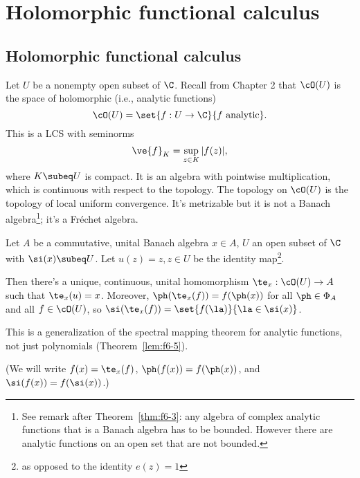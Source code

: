 \chapter{Holomorphic functional calculus}


\section{Holomorphic functional calculus}

Let $U$ be a nonempty open subset of $\C$. Recall from Chapter 2 that $\cO(U)$ is the space of holomorphic (i.e., analytic functions) 
\[
\cO(U)=\set{f:U\to \C}{f\text{ analytic}}.
\]
This is a LCS with seminorms 
\[\ve{f}_K=\sup_{z\in K}|f(z)|,\]
where $K\subeq U$ is compact. It is an algebra with pointwise multiplication, which is continuous with respect to the topology. The topology on $\cO(U)$ is the topology of local uniform convergence. It's metrizable but it is not a Banach algebra\footnote{See remark after Theorem~\ref{thm:f6-3}: any algebra of complex analytic functions that is a Banach algebra has to be bounded. However there are analytic functions on an open set that are not bounded.}; it's a Fr\'echet algebra.

\begin{thm}
Let $A$ be a commutative, unital Banach algebra $x\in A$, $U$ an open subset of $\C$ with $\si(x)\subeq U$. Let $u(z)=z, z\in U$ be the identity map\footnote{as opposed to the identity $e(z)=1$}.

Then there's a unique, continuous, unital homomorphism $\te_x:\cO(U)\to A$ such that $\te_x(u)=x$. Moreover, $\ph(\te_x(f))=f(\ph(x))$ for all $\ph\in \Phi_A$ and all $f\in \cO(U)$, so $\si(\te_x(f))=\set{f(\la)}{\la\in \si(x)}$.
\end{thm}
This is a generalization of the spectral mapping theorem for analytic functions, not just polynomials (Theorem~\ref{lem:f6-5}).

(We will write $f(x)=\te_x(f)$, $\ph(f(x))=f(\ph(x))$, and
$\si(f(x))=f(\si(x))$.) 

